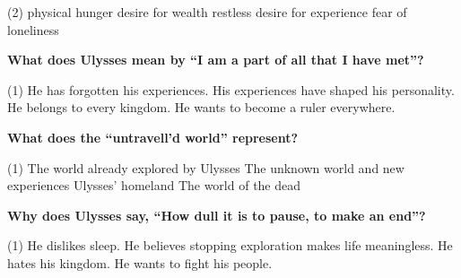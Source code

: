 \documentclass[12pt,a4paper]{exam}
\begin{document}
\begin{questions}
\begin{minipage}{\textwidth}
		\begin{tasks}(2)
			\task physical hunger
			\task desire for wealth
			\task restless desire for experience
			\task fear of loneliness
		\end{tasks}
	\end{minipage}


	\begin{minipage}{\textwidth}
		\question \textbf{What does Ulysses mean by ``I am a part of all that I have met''?}

		\begin{tasks}(1)
			\task He has forgotten his experiences.
			\task His experiences have shaped his personality.
			\task He belongs to every kingdom.
			\task He wants to become a ruler everywhere.
		\end{tasks}
	\end{minipage}


	\begin{minipage}{\textwidth}
		\question \textbf{What does the ``untravell'd world'' represent?}

		\begin{tasks}(1)
			\task The world already explored by Ulysses
			\task The unknown world and new experiences
			\task Ulysses' homeland
			\task The world of the dead
		\end{tasks}
	\end{minipage}


	\begin{minipage}{\textwidth}
		\question \textbf{Why does Ulysses say, ``How dull it is to pause, to make an end''?}

		\begin{tasks}(1)
			\task He dislikes sleep.
			\task He believes stopping exploration makes life meaningless.
			\task He hates his kingdom.
			\task He wants to fight his people.
		\end{tasks}
	\end{minipage}



\end{questions}
\end{document}
